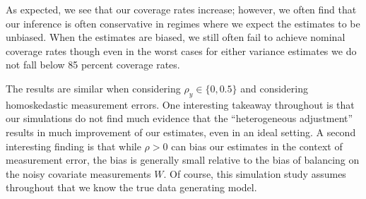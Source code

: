 As expected, we see that our coverage rates increase; however, we often find that our inference is often conservative in regimes where we expect the estimates to be unbiased. When the estimates are biased, we still often fail to achieve nominal coverage rates though even in the worst cases for either variance estimates we do not fall below 85 percent coverage rates.

The results are similar when considering $\rho_y \in \{0, 0.5\}$ and considering homoskedastic measurement errors. One interesting takeaway throughout is that our simulations do not find much evidence that the ``heterogeneous adjustment'' results in much improvement of our estimates, even in an ideal setting. A second interesting finding is that while $\rho > 0$ can bias our estimates in the context of measurement error, the bias is generally small relative to the bias of balancing on the noisy covariate measurements $W$. Of course, this simulation study assumes throughout that we know the true data generating model. 

